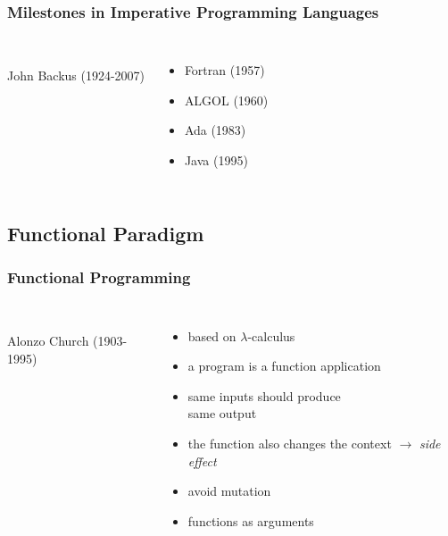 \documentclass[dvipsnames]{beamer}
\theoremstyle{plain}
\begin{document}
\begin{frame}
  \frametitle{Milestones in Imperative Programming Languages}

  \begin{columns}
    \begin{center}
      \\
      John Backus (1924-2007)
    \end{center}

    \begin{itemize}
      \item Fortran (1957)
      \item ALGOL (1960)
      \item Ada (1983)
      \item Java (1995)
    \end{itemize}
  \end{columns}
\end{frame}

\subsection{Functional Paradigm}

\begin{frame}
  \frametitle{Functional Programming}

  \begin{columns}
    \begin{center}
      \\
      Alonzo Church (1903-1995)
    \end{center}

    \begin{itemize}
      \item based on $\lambda$-calculus
      \item a program is a function application
      \item same inputs should produce\\
        same output

      \pause
      \medskip
      \item the function also changes
        the context $\rightarrow$ \emph{side effect}
      \item \alert{avoid mutation}

      \pause
      \medskip
      \item functions as arguments
    \end{itemize}
  \end{columns}
\end{frame}
\end{document}
